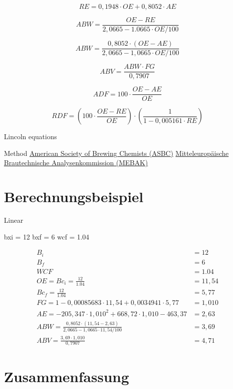 \documentclass[a4paper,parskip=half]{scrartcl}
\newcommand{\bxi}{\mathit{B}_i}
\newcommand{\bxic}{\mathit{Bc}_i}
\newcommand{\bxf}{\mathit{B}_f}
\newcommand{\bxfc}{\mathit{Bc}_f}
\newcommand{\fg}{\mathit{FG}}
\newcommand{\abv}{\mathit{ABV}}
\newcommand{\abw}{\mathit{ABW}}
\newcommand{\oex}{\mathit{OE}}
\newcommand{\aex}{\mathit{AE}}
\newcommand{\rex}{\mathit{RE}}
\newcommand{\wcf}{\mathit{WCF}}
\newcommand{\adf}{\mathit{ADF}}
\newcommand{\rdf}{\mathit{RDF}}
\begin{document}
\begin{equation}
\rex = 0,1948 \cdot \oex + 0,8052 \cdot \aex
\end{equation}

\begin{equation}
\abw = \frac{\oex - \rex}{2,0665 - 1.0665 \cdot \oex / 100}
\end{equation}

\begin{equation}
\abw = \frac{0,8052 \cdot (\oex - \aex)}{2,0665 - 1,0665 \cdot \oex / 100}
\end{equation}

\begin{equation}
\abv = \frac{\abw \cdot \fg}{0,7907}
\end{equation}

\autocite{Spedding2016}

\begin{equation}
\adf = 100 \cdot \frac{\oex - \aex}{\oex}
\end{equation}

\setlength{\jot}{2mm}

\begin{equation}
\rdf = \left(100 \cdot \frac{\oex - \rex}{\oex} \right) \cdot \left(\frac{1}{1 - 0,005161 \cdot \rex} \right)
\end{equation}

\autocite{Speers2015}

Lincoln equations
\autocite{Spedding2016}

Method \href{https://www.asbcnet.org}{American Society of Brewing Chemists (ASBC)} \href{https://www.mebak.org}{Mitteleuropäische Brautechnische Analysenkommission (MEBAK)}

\section*{Berechnungsbeispiel}

Linear

bxi = 12
bxf = 6
wcf = 1.04

\begin{align*}
\bxi &= 12 \\
\bxf &= 6 \\
\wcf &= 1.04 \\
\oex = \bxic = \frac{12}{1.04} &= 11,54 \\
\bxfc = \frac{12}{1.04} &= 5,77 \\
\fg = 1 - 0,00085683 \cdot 11,54 + 0,0034941 \cdot 5,77 &= 1,010 \\
\aex = -205,347 \cdot 1,010^2 + 668,72 \cdot 1,010 - 463,37 &= 2,63 \\
\abw = \frac{0,8052 \cdot (11,54 - 2,63)}{2,0665 - 1,0665 \cdot 11,54 / 100} &= 3,69 \\
\abv = \frac{3,69 \cdot 1,010}{0,7907} &= 4,71
\end{align*}

\section*{Zusammenfassung}

\printbibliography[title=Quellen]
\end{document}
